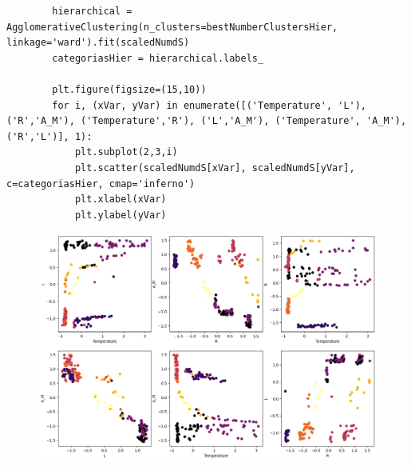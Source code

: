 \begin{longlisting}
    \begin{verbatim}
        hierarchical = AgglomerativeClustering(n_clusters=bestNumberClustersHier, linkage='ward').fit(scaledNumdS)
        categoriasHier = hierarchical.labels_

        plt.figure(figsize=(15,10))
        for i, (xVar, yVar) in enumerate([('Temperature', 'L'), ('R','A_M'), ('Temperature','R'), ('L','A_M'), ('Temperature', 'A_M'), ('R','L')], 1):
            plt.subplot(2,3,i)
            plt.scatter(scaledNumdS[xVar], scaledNumdS[yVar], c=categoriasHier, cmap='inferno')
            plt.xlabel(xVar)
            plt.ylabel(yVar)
    \end{verbatim}
\end{longlisting}
\begin{figure}[H]
    \centering
    \includegraphics[width=\linewidth]{figures/Hierarchical.png}
\end{figure}

